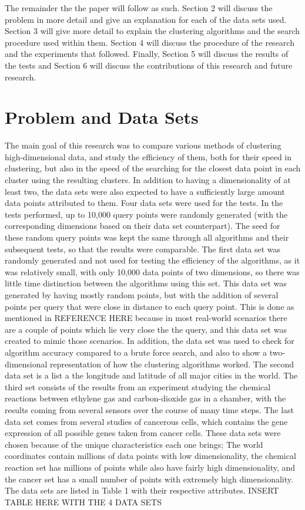 \documentclass[journal]{IEEEtran}
\begin{document}
The remainder the the paper will follow as such. Section 2 will discuss the problem in more detail and give an explanation for each of the data sets used. Section 3 will give more detail to explain the clustering algorithms and the search procedure used within them. Section 4 will discuss the procedure of the research and the experiments that followed. Finally, Section 5 will discuss the results of the tests and Section 6 will discuss the contributions of this research and future research.

\section{Problem and Data Sets}
The main goal of this research was to compare various methods of clustering high-dimensional data, and study the efficiency of them, both for their speed in clustering, but also in the speed of the searching for the closest data point in each cluster using the resulting clusters. In addition to having a dimensionality of at least two, the data sets were also expected to have a sufficiently large amount data points attributed to them. Four data sets were used for the tests. In the tests performed, up to 10,000 query points were randomly generated (with the corresponding dimensions based on their data set counterpart). The seed for these random query points was kept the same through all algorithms and their subsequent tests, so that the results were comparable. The first data set was randomly generated and not used for testing the efficiency of the algorithms, as it was relatively small, with only 10,000 data points of two dimensions, so there was little time distinction between the algorithms using this set. This data set was generated by having mostly random points, but with the addition of several points per query that were close in distance to each query point. This is done as mentioned in REFERENCE HERE because in most real-world scenarios there are a couple of points which lie very close the the query, and this data set was created to mimic those scenarios. In addition, the data set was used to check for algorithm accuracy compared to a brute force search, and also to show a two-dimensional representation of how the clustering algorithms worked. The second data set is a list a the longitude and latitude of all major cities in the world. The third set consists of the results from an experiment studying the chemical reactions between ethylene gas and carbon-dioxide gas in a chamber, with the results coming from several sensors over the course of many time steps. The last data set comes from several studies of cancerous cells, which contains the gene expression of all possible genes taken from cancer cells. These data sets were chosen because of the unique characteristics each one brings; The world coordinates contain millions of data points with low dimensionality, the chemical reaction set has millions of points while also have fairly high dimensionality, and the cancer set has a small number of points with extremely high dimensionality. The data sets are listed in Table 1 with their respective attributes.
INSERT TABLE HERE WITH THE 4 DATA SETS
\end{document}
